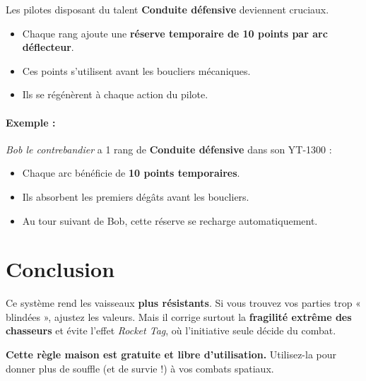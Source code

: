 \documentclass{article}
\begin{document}
Les pilotes disposant du talent \textbf{Conduite défensive} deviennent cruciaux.

\begin{itemize}
  \item Chaque rang ajoute une \textbf{réserve temporaire de 10 points par arc déflecteur}.
  \item Ces points s’utilisent avant les boucliers mécaniques.
  \item Ils se régénèrent à chaque action du pilote.
\end{itemize}

\paragraph{Exemple :}
\textit{Bob le contrebandier} a 1 rang de \textbf{Conduite défensive} dans son YT-1300 :
\begin{itemize}
  \item Chaque arc bénéficie de \textbf{10 points temporaires}.
  \item Ils absorbent les premiers dégâts avant les boucliers.
  \item Au tour suivant de Bob, cette réserve se recharge automatiquement.
\end{itemize}

\section*{Conclusion}
Ce système rend les vaisseaux \textbf{plus résistants}.  
Si vous trouvez vos parties trop « blindées », ajustez les valeurs.  
Mais il corrige surtout la \textbf{fragilité extrême des chasseurs} et évite l’effet \textit{Rocket Tag}, 
où l’initiative seule décide du combat.  

\bigskip
\textbf{Cette règle maison est gratuite et libre d’utilisation.}  
Utilisez-la pour donner plus de souffle (et de survie !) à vos combats spatiaux.
\end{document}
